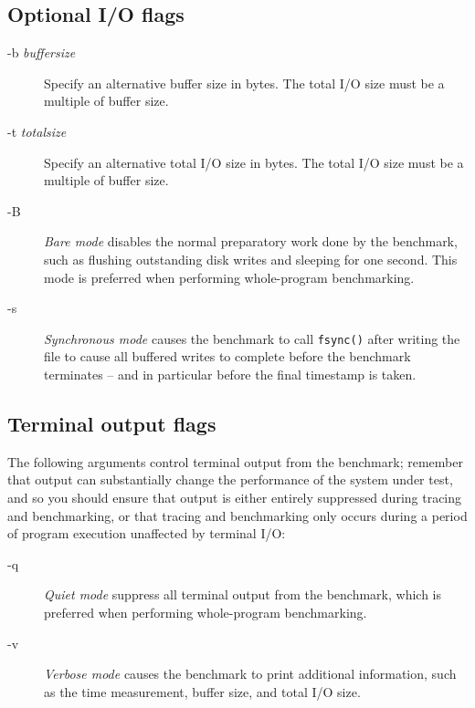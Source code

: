 \documentclass[a4paper,10pt]{article}
\newcommand{\code}[1]{\texttt{\small #1}}
\begin{document}
\subsection*{Optional I/O flags}

\begin{description}
\item[-b \textit{buffersize}] Specify an alternative buffer size in bytes.
  The total I/O size must be a multiple of buffer size.

\item[-t \textit{totalsize}] Specify an alternative total I/O size in bytes.
  The total I/O size must be a multiple of buffer size.

\item[-B] \textit{Bare mode} disables the normal preparatory work done by the
  benchmark, such as flushing outstanding disk writes and sleeping for one
  second.
  This mode is preferred when performing whole-program benchmarking.


\item[-s] \textit{Synchronous mode} causes the benchmark to call
  \code{fsync()} after writing the file to cause all buffered writes to
  complete before the benchmark terminates -- and in particular before the
  final timestamp is taken.
\end{description}

\subsection*{Terminal output flags}

\noindent
The following arguments control terminal output from the benchmark; remember
that output can substantially change the performance of the system under test,
and so you should ensure that output is either entirely suppressed during
tracing and benchmarking, or that tracing and benchmarking only occurs during
a period of program execution unaffected by terminal I/O:

\begin{description}
\item[-q] \textit{Quiet mode} suppress all terminal output from the benchmark,
  which is preferred when performing whole-program benchmarking.

\item[-v] \textit{Verbose mode} causes the benchmark to print additional
  information, such as the time measurement, buffer size, and total I/O size.
\end{description}
\end{document}
